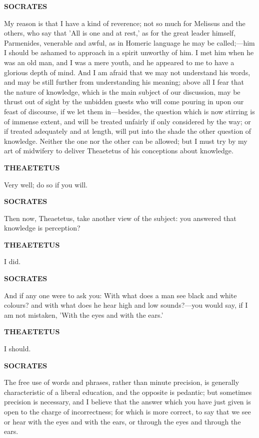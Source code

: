 \documentclass[11pt,letter]{article}
\begin{document}
\par \textbf{SOCRATES}
\par   My reason is that I have a kind of reverence; not so much for Melissus and the others, who say that 'All is one and at rest,' as for the great leader himself, Parmenides, venerable and awful, as in Homeric language he may be called;—him I should be ashamed to approach in a spirit unworthy of him. I met him when he was an old man, and I was a mere youth, and he appeared to me to have a glorious depth of mind. And I am afraid that we may not understand his words, and may be still further from understanding his meaning; above all I fear that the nature of knowledge, which is the main subject of our discussion, may be thrust out of sight by the unbidden guests who will come pouring in upon our feast of discourse, if we let them in—besides, the question which is now stirring is of immense extent, and will be treated unfairly if only considered by the way; or if treated adequately and at length, will put into the shade the other question of knowledge. Neither the one nor the other can be allowed; but I must try by my art of midwifery to deliver Theaetetus of his conceptions about knowledge.

\par \textbf{THEAETETUS}
\par   Very well; do so if you will.

\par \textbf{SOCRATES}
\par   Then now, Theaetetus, take another view of the subject:  you answered that knowledge is perception?

\par \textbf{THEAETETUS}
\par   I did.

\par \textbf{SOCRATES}
\par   And if any one were to ask you:  With what does a man see black and white colours? and with what does he hear high and low sounds?—you would say, if I am not mistaken, 'With the eyes and with the ears.'

\par \textbf{THEAETETUS}
\par   I should.

\par \textbf{SOCRATES}
\par   The free use of words and phrases, rather than minute precision, is generally characteristic of a liberal education, and the opposite is pedantic; but sometimes precision is necessary, and I believe that the answer which you have just given is open to the charge of incorrectness; for which is more correct, to say that we see or hear with the eyes and with the ears, or through the eyes and through the ears.
\end{document}

